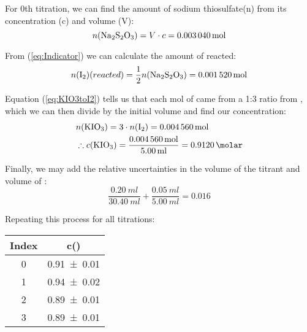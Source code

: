 For 0th titration, we can find the amount of sodium thiosulfate(n) from its concentration (c) and volume (V):
\begin{equation*}
 n(\ce{Na2S2O3}) = V \cdot c = \SI{0.003040}{\mol}
\end{equation*}

From (\ref{eq:Indicator}) we can calculate the amount of  reacted:
\begin{equation*}
 n(\ce{I2})(reacted) = \frac{1}{2}n(\ce{Na2S2O3}) = \SI{0.001520}{\mol}
\end{equation*}

Equation (\ref{eq:KIO3toI2}) tells us that each mol of  came from a 1:3 ratio from , which we can then divide by the initial volume and find our concentration:
\begin{equation*}
\begin{split}
 &n(\ce{KIO3}) = 3\cdot n(\ce{I2}) = \SI{0.004560}{\mol} \\
 &\therefore c(\ce{KIO3}) = \frac{ \SI{0.004560}{\mol} }{ \SI{5.00}{ml} } = \SI{0.9120}{\molar}
\end{split}
\end{equation*}

Finally, we may add the relative uncertainties in the volume of the titrant and volume of :
\begin{equation*}
\frac{\SI{0.20}{ml} }{ \SI{30.40}{ml} } + \frac{ \SI{0.05}{ml} }{ \SI{5.00}{ml} } = 0.016
\end{equation*}

Repeating this process for all titrations:
\begin{table}[h] \centering
\begin{tabular}{c c}
	Index & c(\ce{KIO3}) \si{\molar}\\ \hline
	0	&	\SI{0.91\pm0.01}{\molar}\\
	1	&	\SI{0.94\pm0.02}{\molar}\\
	2	&	\SI{0.89\pm0.01}{\molar}\\
	3	&	\SI{0.89\pm0.01}{\molar}\\
\end{tabular}
\end{table}